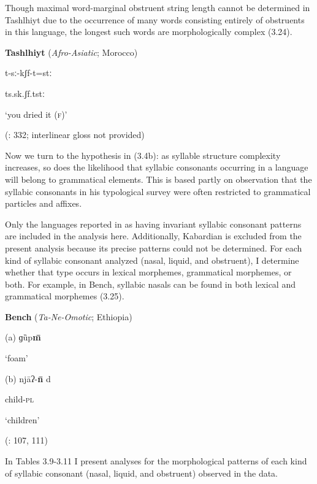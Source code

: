 Though maximal word-marginal obstruent string length cannot be determined in Tashlhiyt due to the occurrence of many words consisting entirely of obstruents in this language, the longest such words are morphologically complex (3.24).

\ea\label{ex:(3.24)}
  \textbf{Tashlhiyt} (\textit{Afro-Asiatic}; Morocco)

t-sː-kʃf-t=stː

ts.sk.ʃf.tstː

‘you dried it (\textsc{f})’

(\citealt{Ridouane2008}: 332; interlinear gloss not provided)

\z

  Now we turn to the hypothesis in (3.4b): as syllable structure complexity increases, so does the likelihood that syllabic consonants occurring in a language will belong to grammatical elements. This is based partly on  observation that the syllabic consonants in his typological survey were often restricted to grammatical particles and affixes.

  Only the languages reported in  as having invariant syllabic consonant patterns are included in the analysis here. Additionally, Kabardian is excluded from the present analysis because its precise patterns could not be determined. For each kind of syllabic consonant analyzed (nasal, liquid, and obstruent), I determine whether that type occurs in lexical morphemes, grammatical morphemes, or both. For example, in Bench, syllabic nasals can be found in both lexical and grammatical morphemes (3.25).

\ea\label{ex:(3.25)}
  \textbf{Bench} (\textit{Ta-Ne-Omotic}; Ethiopia)

(a)   ɡȕp\textbf{m\={} }

‘foam’

(b)   njāʔ-\textbf{n\={} }d

child-\textsc{pl}

‘children’

(\citealt{Rapold2006}: 107, 111)

\z

  In Tables 3.9-3.11 I present analyses for the morphological patterns of each kind of syllabic consonant (nasal, liquid, and obstruent) observed in the data.

